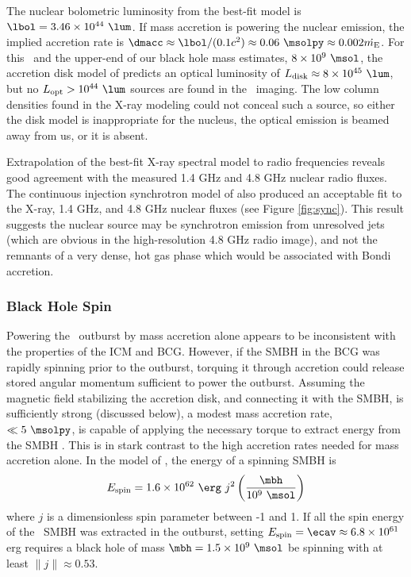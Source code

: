\documentclass[11pt, preprint]{aastex}
\begin{document}
The nuclear bolometric luminosity from the best-fit model is $\lbol =
3.46 \times 10^{44} ~\lum$. If mass accretion is powering the nuclear
emission, the implied accretion rate is $\dmacc \approx \lbol/(0.1
c^2) \approx 0.06 ~\msolpy \approx 0.002 \dme$. For this \dmacc\ and
the upper-end of our black hole mass estimates, $8 \times 10^{9}
~\msol$, the accretion disk model of \citet{2002NewAR..46..247M}
predicts an optical luminosity of $\ldisk \approx 8 \times 10^{45}
~\lum$, but no $L_{\rm{opt}} > 10^{44} ~\lum$ sources are found in the
\hst\ imaging. The low column densities found in the X-ray modeling
could not conceal such a source, so either the disk model is
inappropriate for the nucleus, the optical emission is beamed away
from us, or it is absent.

Extrapolation of the best-fit X-ray spectral model to radio
frequencies reveals good agreement with the measured 1.4 GHz and 4.8
GHz nuclear radio fluxes. The continuous injection synchrotron model
of \citet{1987MNRAS.225..335H} also produced an acceptable fit to the
X-ray, 1.4 GHz, and 4.8 GHz nuclear fluxes (see Figure
\ref{fig:sync}). This result suggests the nuclear source may be
synchrotron emission from unresolved jets (which are obvious in the
high-resolution 4.8 GHz radio image), and not the remnants of a very
dense, hot gas phase which would be associated with Bondi accretion.

\subsubsection{Black Hole Spin}

Powering the \rbs\ outburst by mass accretion alone appears to be
inconsistent with the properties of the ICM and BCG. However, if the
SMBH in the BCG was rapidly spinning prior to the outburst, torquing
it through accretion could release stored angular momentum sufficient
to power the outburst. Assuming the magnetic field stabilizing the
accretion disk, and connecting it with the SMBH, is sufficiently
strong (discussed below), a modest mass accretion rate, \eg\ $\ll 5
~\msolpy$, is capable of applying the necessary torque to extract
energy from the SMBH \citep{1999ApJ...522..753M}. This is in stark
contrast to the high accretion rates needed for mass accretion
alone. In the model of \citet{1999ApJ...522..753M}, the energy of a
spinning SMBH is
\begin{equation}
  E_{\rm{spin}} = 1.6 \times 10^{62} ~{\erg} ~j^2
  \left(\frac{\mbh}{10^9 ~\msol}\right)
\end{equation}
where $j$ is a dimensionless spin parameter between -1 and 1. If all
the spin energy of the \rbs\ SMBH was extracted in the outburst,
setting $E_{\rm{spin}} = \ecav \approx 6.8 \times 10^{61}$ erg
requires a black hole of mass $\mbh = 1.5 \times 10^{9} ~\msol$ be
spinning with at least $\|j\| \approx 0.53$.
\end{document}
